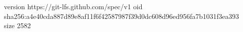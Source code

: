 version https://git-lfs.github.com/spec/v1
oid sha256:a4e40cda887d89e8af11f6f42587987f39d0dc608d96ed956fa7b1031f3ea393
size 2582
